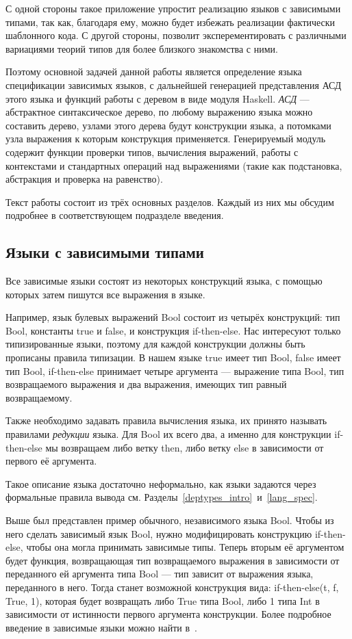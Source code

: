 С одной стороны такое приложение упростит реализацию языков с зависимыми типами, так как, благодаря ему, можно будет избежать реализации фактически шаблонного кода. С другой стороны, позволит эксперементировать с различными вариациями теорий типов для более близкого знакомства с ними.

Поэтому основной задачей данной работы является определение языка спецификации зависимых языков, с дальнейшей генерацией представления АСД этого языка и функций работы с деревом в виде модуля Haskell\cite{haskell}. \textit{АСД} --- абстрактное синтаксическое дерево, по любому выражению языка можно составить дерево, узлами этого дерева будут конструкции языка, а потомками узла выражения к которым конструкция применяется. Генерируемый модуль содержит функции проверки типов, вычисления выражений, работы с контекстами и стандартных операций над выражениями (такие как подстановка, абстракция и проверка на равенство).

Текст работы состоит из трёх основных разделов. Каждый из них мы обсудим подробнее в соответствующем подразделе введения.

\subsection*{Языки с зависимыми типами}

Все зависимые языки состоят из некоторых конструкций языка, с помощью которых затем пишутся все выражения в языке.

Например, язык булевых выражений Bool состоит из четырёх конструкций: тип Bool, константы true и false, и конструкция if-then-else. Нас интересуют только типизированные языки, поэтому для каждой конструкции должны быть прописаны правила типизации. В нашем языке true имеет тип Bool, false имеет тип Bool, if-then-else принимает четыре аргумента --- выражение типа Bool, тип возвращаемого выражения и два выражения, имеющих тип равный возвращаемому.

Также необходимо задавать правила вычисления языка, их принято называть правилами \textit{редукции} языка. Для Bool их всего два, а именно для конструкции if-then-else мы возвращаем либо ветку then, либо ветку else в зависимости от первого её аргумента.

Такое описание языка достаточно неформально, как языки задаются через формальные правила вывода см. Разделы~\ref{deptypes_intro}~и~\ref{lang_spec}.

Выше был представлен пример обычного, независимого языка Bool. Чтобы из него сделать зависимый язык Bool, нужно модифицировать конструкцию if-then-else, чтобы она могла принимать зависимые типы. Теперь вторым её аргументом будет функция, возвращающая тип возвращаемого выражения в зависимости от переданного ей аргумента типа Bool --- тип зависит от выражения языка, переданного в него. Тогда станет возможной конструкция вида: if-then-else(t, f, True, 1), которая будет возвращать либо True типа Bool, либо 1 типа Int в зависимости от истинности первого аргумента конструкции. Более подробное введение в зависимые языки можно найти в~\cite{martin_lof}.


